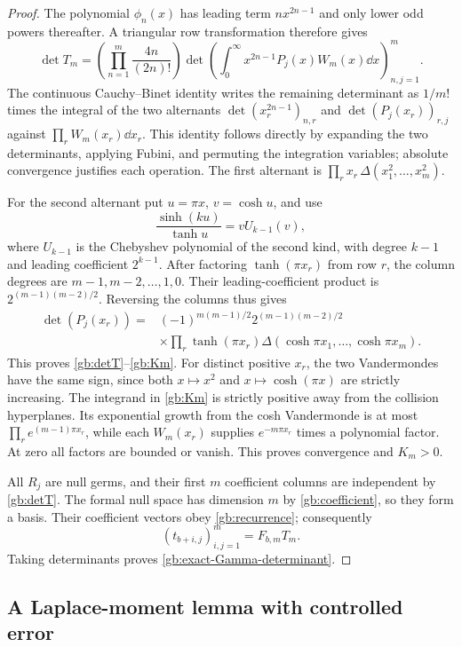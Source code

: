 \begin{proof}
The polynomial $\phi_n(x)$ has leading term $nx^{2n-1}$ and
only lower odd powers thereafter.  A triangular row transformation
therefore gives
\[
 \det T_m=\left(\prod_{n=1}^m\frac{4n}{(2n)!}\right)
       \det\left(\int_0^\infty x^{2n-1}P_j(x)W_m(x)\dd x\right)_{n,j=1}^m.
\]
The continuous Cauchy--Binet identity writes the remaining determinant
as $1/m!$ times the integral of the two alternants
$\det(x_r^{2n-1})_{n,r}$ and $\det(P_j(x_r))_{r,j}$ against
$\prod_rW_m(x_r)\dd x_r$.  This identity follows directly by
expanding the two determinants, applying Fubini, and permuting the
integration variables; absolute convergence justifies each operation.
The first alternant is $\prod_rx_r\,\Delta(x_1^2,\ldots,x_m^2)$.

For the second alternant put $u=\pi x$, $v=\cosh u$, and use
\[
              \frac{\sinh(ku)}{\tanh u}=vU_{k-1}(v),
\]
where $U_{k-1}$ is the Chebyshev polynomial of the second kind,
with degree $k-1$ and leading coefficient $2^{k-1}$.
After factoring $\tanh(\pi x_r)$ from row $r$, the column
degrees are $m-1,m-2,\ldots,1,0$.  Their leading-coefficient
product is $2^{(m-1)(m-2)/2}$.  Reversing the columns thus gives
\[
\begin{split}
 \det(P_j(x_r))={}&(-1)^{m(m-1)/2}2^{(m-1)(m-2)/2}\\
 &\times\prod_r\tanh(\pi x_r)
              \Delta(\cosh\pi x_1,\ldots,\cosh\pi x_m).
\end{split}
\]
This proves \eqref{gb:detT}--\eqref{gb:Km}.  For distinct
positive $x_r$, the two Vandermondes have the same sign, since
both $x\mapsto x^2$ and $x\mapsto\cosh(\pi x)$ are strictly
increasing.  The integrand in \eqref{gb:Km} is strictly positive
away from the collision hyperplanes.  Its exponential growth from
the cosh Vandermonde is at most
$\prod_re^{(m-1)\pi x_r}$, while each $W_m(x_r)$ supplies
$e^{-m\pi x_r}$ times a polynomial factor.  At zero all factors
are bounded or vanish.  This proves convergence and $K_m>0$.

All $R_j$ are null germs, and their first $m$ coefficient columns
are independent by \eqref{gb:detT}.  The formal null space has
dimension $m$ by \eqref{gb:coefficient}, so they form a basis.
Their coefficient vectors obey \eqref{gb:recurrence}; consequently
\[
                  (t_{b+i,j})_{i,j=1}^m=F_{b,m}T_m.
\]
Taking determinants proves \eqref{gb:exact-Gamma-determinant}.
\end{proof}

\subsection{A Laplace-moment lemma with controlled error}

